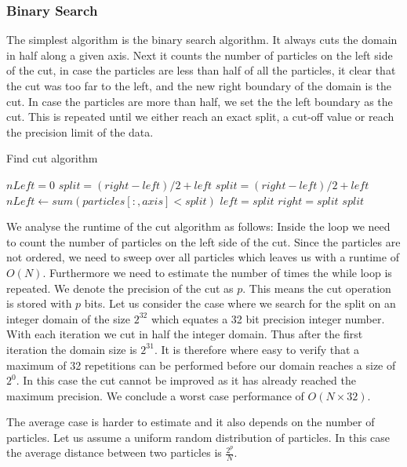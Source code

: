 \documentclass[]{article}
\begin{document}
\subsubsection{Binary Search}
The simplest algorithm is the binary search algorithm. It always cuts the domain in half along a given axis. Next it counts the number of particles on the left side of the cut, in case the particles are less than half of all the particles, it clear that the cut was too far to the left, and the new right boundary of the domain is the cut. In case the particles are more than half, we set the the left boundary as the cut. This is repeated until we either reach an exact split, a cut-off value or reach the precision limit of the data.


\begin{algorithm}[H]
	\caption{Find cut algorithm}\label{euclid}
	\begin{algorithmic}[1]
		\State $nLeft = 0$
		\State $split = (right - left) / 2 + left $ 
		\State $split = (right - left) / 2 + left $
		\State $nLeft\gets sum(particles[:,axis] < split)$
		\State $left = split$
		\Else 
		\State $right = split$
		\EndIf
		\EndWhile\label{euclidendwhile}
		\State \Return $split$
		\EndProcedure
	\end{algorithmic}
\end{algorithm}

We analyse the runtime of the cut algorithm as follows: Inside the loop we need to count the number of particles on the left side of the cut. Since the particles are not ordered, we need to sweep over all particles which leaves us with a runtime of $O(N)$. Furthermore we need to estimate the number of times the while loop is repeated. We denote the precision of the cut as $p$. This means the cut operation is stored with $p$ bits. 
Let us consider the case where we search for the split on an integer domain of the size $2^{32}$ which equates a 32 bit precision integer number. With each iteration we cut in half the integer domain. Thus after the first iteration the domain size is $2^{31}$. It is therefore where easy to verify that a maximum of 32 repetitions can be performed before our domain reaches a size of $2^0$. In this case the cut cannot be improved as it has already reached the maximum precision. We conclude a worst case performance of $O(N \times 32)$. 

The average case is harder to estimate and it also depends on the number of particles. Let us assume a uniform random distribution of particles. In this case the average distance between two particles is $\frac{2^{p}}{N}$. 
\end{document}
